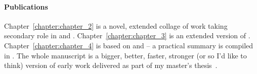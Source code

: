 {\paragraph{Publications}
Chapter~\ref{chapter:chapter_2} is a novel, extended collage of work taking secondary role in \citet{kogkalidis-etal-2020-aethel} and \citet{rouss}.
Chapter~\ref{chapter:chapter_3} is an extended version of \citet{kogkalidis-etal-2020-aethel}.
Chapter~\ref{chapter:chapter_4} is based on \citet{kogkalidis-etal-2019-constructive,kogkalidis-etal-2020-neural} and \citet[preprint]{kogkalidis2022geometryaware} -- a practical summary is compiled in \citet{spindle}.
The whole manuscript is a bigger, better, faster, stronger (or so I'd like to think) version of early work delivered as part of my master's thesis~\cite{https://doi.org/10.48550/arxiv.1909.02955}.



\relax
}